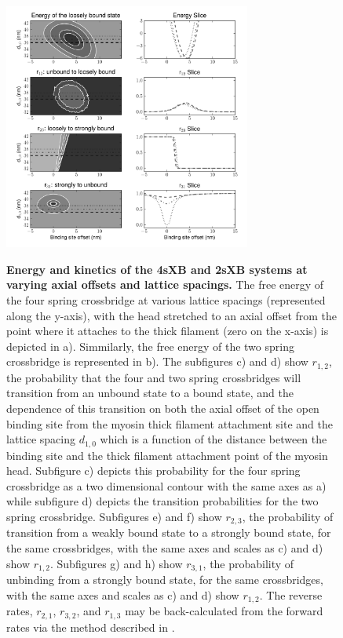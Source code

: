 \documentclass[]{article}
\begin{document}
\begin{figure}[htbp]
    \begin{center}
    \includegraphics[width=3.2in]{../imgs/Figure2.pdf}
    \label{kinetics_contours}
    \caption{
        \textbf{Energy and kinetics of the 4sXB and 2sXB systems at varying axial offsets and lattice spacings.} 
        The free energy of the four spring crossbridge at various lattice spacings (represented along the y-axis), with the head stretched to an axial offset from the point where it attaches to the thick filament (zero on the x-axis) is depicted in a). Simmilarly, the free energy of the two spring crossbridge is represented in b).
        The subfigures c) and d) show $r_{1,2}$, the probability that the four and two spring crossbridges will transition from an unbound state to a bound state, and the dependence of this transition on both the axial offset of the open binding site from the myosin thick filament attachment site and the lattice spacing $d_{1,0}$ which is a function of the distance between the binding site and the thick filament attachment point of the myosin head. Subfigure c) depicts this probability for the four spring crossbridge as a two dimensional contour with the same axes as a) while subfigure d) depicts the transition probabilities for the two spring crossbridge.
        Subfigures e) and f) show $r_{2,3}$, the probability of transition from a weakly bound state to a strongly bound state, for the same crossbridges, with the same axes and scales as c) and d) show $r_{1,2}$.
        Subfigures g) and h) show $r_{3,1}$, the probability of unbinding from a strongly bound state, for the same crossbridges, with the same axes and scales as c) and d) show $r_{1,2}$.
        The reverse rates, $r_{2,1}$, $r_{3,2}$, and $r_{1,3}$ may be back-calculated from the forward rates via the method described in \cite{Tanner:2007:pe115}.
    }
    \end{center}
\end{figure}
\end{document}
